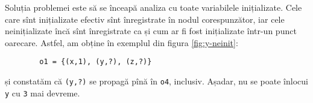 Soluția problemei este să se înceapă analiza cu toate variabilele inițializate.
Cele care sînt inițializate efectiv sînt înregistrate în nodul corespunzător,
iar cele neinițializate încă sînt înregistrate ca și cum ar fi fost inițializate
într-un punct oarecare. Astfel, am obține în exemplul din figura \ref{fig:y-neinit}:
\begin{center}
    \begin{BVerbatim}
        o1 = {(x,1), (y,?), (z,?)}
    \end{BVerbatim}
\end{center}
și constatăm că  \texttt{(y,?)} se propagă pînă în \texttt{o4},
inclusiv. Așadar, nu se poate înlocui \texttt{y} cu \texttt{3} mai devreme.



